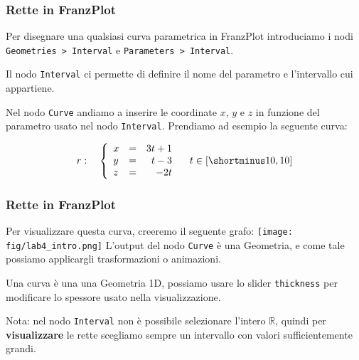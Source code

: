 \documentclass{beamer}
\newcommand{\fig}{./figures} %
\newcommand{\frnzplt}{FranzPlot }
\begin{document}
\begin{frame}
    \frametitle{Rette in \frnzplt}
    Per disegnare una qualsiasi curva parametrica in \frnzplt introduciamo i nodi \texttt{Geometries > Interval} e \texttt{Parameters > Interval}.

    \vspace{0.25cm}
    Il nodo \texttt{Interval} ci permette di definire il nome del parametro e l'intervallo cui appartiene.

    \vspace{0.25cm}
    Nel nodo \texttt{Curve} andiamo a inserire le coordinate $x$, $y$ e $z$ in funzione del parametro usato nel nodo \texttt{Interval}. Prendiamo ad esempio
    la seguente curva:

$$
r: \quad \left\{
\begin{array}{lcr}
x&=&3t+1\\
y&=&t-3\\
z&=&-2t
\end{array}
\right.
    \quad t\in \left[ \shortminus 10, 10 \right]
$$
    \end{frame}
    
\begin{frame}
    \frametitle{Rette in \frnzplt}
    Per visualizzare questa curva, creeremo il seguente grafo:
\texttt{[image: \\fig/lab4\_intro.png]}
    L'output del nodo \texttt{Curve} \`e una Geometria, e come tale possiamo applicargli trasformazioni o animazioni.

    Una curva \`e una una Geometria 1D, possiamo usare lo slider \texttt{thickness} per modificare lo spessore usato nella visualizzazione.

    \vspace{0.5cm}
    Nota: nel nodo \texttt{Interval} non \`e possibile selezionare l'intero $\mathbb R$, quindi per \textbf{visualizzare} le rette scegliamo sempre un intervallo
    con valori sufficientemente grandi.

    \end{frame}
\end{document}
